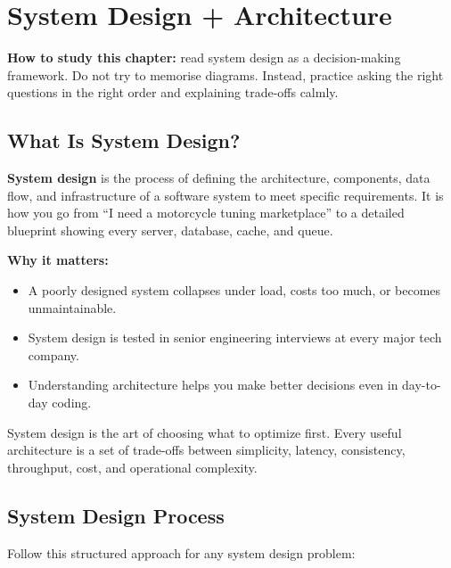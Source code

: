 \documentclass[12pt, a4paper, oneside]{book}
\begin{document}
\chapter{System Design + Architecture}

\begin{studybox}
\textbf{How to study this chapter:} read system design as a decision-making framework. Do not try to memorise diagrams. Instead, practice asking the right questions in the right order and explaining trade-offs calmly.
\end{studybox}

\section{What Is System Design?}

\textbf{System design} is the process of defining the architecture, components, data flow, and infrastructure of a software system to meet specific requirements. It is how you go from ``I need a motorcycle tuning marketplace'' to a detailed blueprint showing every server, database, cache, and queue.

\textbf{Why it matters:}
\begin{itemize}[leftmargin=2em]
    \item A poorly designed system collapses under load, costs too much, or becomes unmaintainable.
    \item System design is tested in senior engineering interviews at every major tech company.
    \item Understanding architecture helps you make better decisions even in day-to-day coding.
\end{itemize}

\begin{intuitionbox}
System design is the art of choosing what to optimize first. Every useful architecture is a set of trade-offs between simplicity, latency, consistency, throughput, cost, and operational complexity.
\end{intuitionbox}

\section{System Design Process}

Follow this structured approach for any system design problem:
\end{document}
